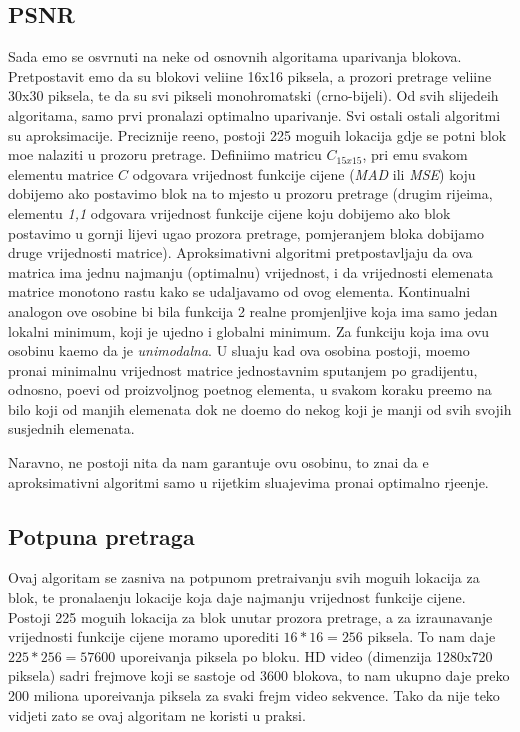 \subsection{PSNR}

Sada \cj emo se osvrnuti na neke od osnovnih algoritama uparivanja blokova. Pretpostavit \cj emo da su blokovi veli\ch ine 16x16 piksela, a prozori pretrage veli\ch ine 30x30 piksela, te da su svi pikseli monohromatski
(crno-bijeli). Od svih slijede\cj ih algoritama, samo prvi pronalazi optimalno uparivanje. Svi ostali ostali algoritmi su aproksimacije. Preciznije re\ch eno, postoji 225 mogu\cj ih lokacija gdje se po\ch tni blok mo\zh e nalaziti
u prozoru pretrage. Defini\sh imo matricu $C_{15x15}$, pri \ch emu svakom elementu matrice $C$ odgovara vrijednost funkcije cijene (\textit{MAD} ili \textit{MSE}) koju dobijemo ako postavimo blok na to mjesto u prozoru pretrage
(drugim rije\ch ima, elementu \textit{1,1} odgovara vrijednost funkcije cijene koju dobijemo ako blok postavimo u gornji lijevi ugao prozora pretrage, pomjeranjem bloka dobijamo druge vrijednosti matrice).
Aproksimativni algoritmi pretpostavljaju da ova matrica ima jednu najmanju (optimalnu) vrijednost, i da vrijednosti elemenata matrice monotono rastu kako se udaljavamo od ovog elementa. Kontinualni analogon ove osobine
bi bila funkcija 2 realne promjenljive koja ima samo jedan lokalni minimum, koji je ujedno i globalni minimum. Za funkciju koja ima ovu osobinu ka\zh emo da je \textit{unimodalna}. U slu\ch aju kad ova osobina postoji,
mo\zh emo prona\cj i minimalnu vrijednost matrice jednostavnim spu\sh tanjem po gradijentu, odnosno, po\ch ev\sh i od proizvoljnog po\ch etnog elementa, u svakom koraku pre\dj emo na bilo koji od manjih elemenata dok ne
do\dj emo do nekog koji je manji od svih svojih susjednih elemenata.

Naravno, ne postoji ni\sh ta da nam garantuje ovu osobinu, \sh to zna\ch i da \cj e aproksimativni algoritmi samo u rijetkim slu\ch ajevima prona\cj i optimalno rje\sh enje.

\subsection{Potpuna pretraga}
Ovaj algoritam se zasniva na potpunom pretra\zh ivanju svih mogu\cj ih lokacija za blok, te pronala\zh enju lokacije koja daje najmanju vrijednost funkcije cijene. Postoji 225 mogu\cj ih lokacija za blok unutar prozora pretrage,
a za izra\ch unavanje vrijednosti funkcije cijene moramo uporediti $16 * 16 = 256$ piksela. To nam daje $225 * 256 = 57600$ upore\dj ivanja piksela po bloku. HD video (dimenzija 1280x720 piksela) sadr\zh i frejmove koji se
sastoje od 3600 blokova, \sh to nam ukupno daje preko 200 miliona upore\dj ivanja piksela za svaki frejm video sekvence. Tako da nije te\sh ko vidjeti za\sh to se ovaj algoritam ne koristi u praksi.

